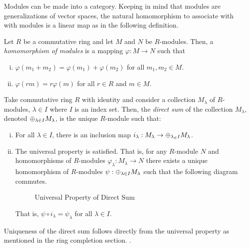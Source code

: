 \documentclass[../sean_thesis.tex]{subfiles}
\begin{document}

Modules can be made into a category. Keeping in mind that modules are generalizations of vector spaces, the natural homomorphism to associate with with modules is a linear map as in the following definition.

\begin{definition}
	Let $R$ be a commutative ring and let $M$ and $N$ be $R$-modules. Then, a \emph{homomorphism of modules} is a mapping $\varphi: M \to N$ such that
\vspace{-\varparskip}
	\begin{enumerate}[(i)]
		\item $\varphi(m_1+m_2) = \varphi(m_1) + \varphi(m_2)$ for all $m_1,m_2 \in M$.
		\item $\varphi(rm) = r\varphi(m)$ for all $r \in R$ and $m \in M$.
	\end{enumerate}
\end{definition}



\begin{definition}
	Take commutative ring $R$ with identity and consider a collection $M_\lambda$ of $R$-modules, $\lambda \in I$ where $I$ is an index set. Then, the \emph{direct sum} of the collection $M_\lambda$, denoted $\oplus_{\lambda \in I} M_\lambda$, is the unique $R$-module such that:
\vspace{-\varparskip}
	\begin{enumerate}[(i)]
		\item For all $\lambda \in I$, there is an inclusion map $i_\lambda: M_\lambda \to \oplus_{\lambda_\in I}M_\lambda$.
		\item The universal property is satisfied. That is, for any $R$-module $N$ and homomorphisms of $R$-modules $\varphi_\lambda: M_\lambda \to N$ there exists a unique homomorphism of $R$-modules $\psi: \oplus_{\lambda \in I} M_\lambda$ such that the following diagram commutes.
		\begin{figure}[ht!]
			
			\caption{Universal Property of Direct Sum}
			\label{fig:direct_sum_univ_property}
		\end{figure}
		That is, $\psi \circ i_\lambda = \psi_\lambda$ for all $\lambda \in I$.
	\end{enumerate}
\end{definition}
Uniqueness of the direct sum follows directly from the universal property as mentioned in the ring completion section. .
\end{document}
